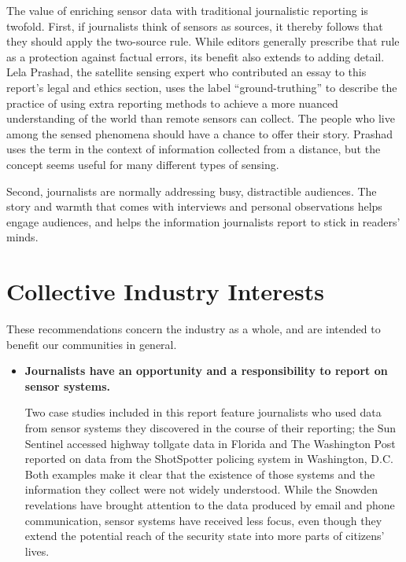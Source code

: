 \begin{itemize}
\begin{itemized}
\begin{itemize}
The value of enriching sensor data with traditional journalistic reporting
is twofold. First, if journalists think of sensors as sources, it thereby follows
that they should apply the two-source rule. While editors generally
prescribe that rule as a protection against factual errors, its benefit also
extends to adding detail. Lela Prashad, the satellite sensing expert who
contributed an essay to this report's legal and ethics section, uses the label
``ground-truthing'' to describe the practice of using extra reporting methods
to achieve a more nuanced understanding of the world than remote sensors
can collect. The people who live among the sensed phenomena should have
a chance to offer their story. Prashad uses the term in the context of information
collected from a distance, but the concept seems useful for many
different types of sensing.

Second, journalists are normally addressing busy, distractible audiences.
The story and warmth that comes with interviews and personal observations
helps engage audiences, and helps the information journalists report
to stick in readers' minds.
\end{itemize}
\section{Collective Industry Interests}
These recommendations concern the industry as a whole, and are intended
to benefit our communities in general.
\begin{itemize}
\item \textbf{Journalists have an opportunity and a responsibility to report on
sensor systems.}

Two case studies included in this report feature journalists who used data
from sensor systems they discovered in the course of their reporting; the
Sun Sentinel accessed highway tollgate data in Florida and The Washington
Post reported on data from the ShotSpotter policing system in Washington,
D.C. Both examples make it clear that the existence of those systems and the information they collect were not widely understood. While the
Snowden revelations have brought attention to the data produced by email
and phone communication, sensor systems have received less focus, even
though they extend the potential reach of the security state into more parts
of citizens' lives.


\end{itemize}
\end{itemized}
\end{itemize}
